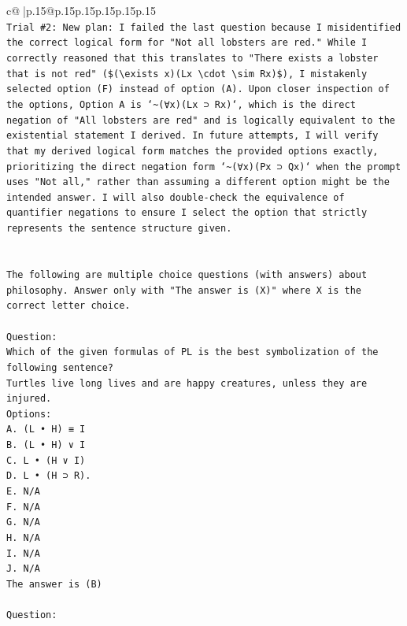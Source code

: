 \documentclass{article}
\begin{document}
{\begin{supertabular}{c@{$\;$}|p{.15\linewidth}@{}p{.15\linewidth}p{.15\linewidth}p{.15\linewidth}p{.15\linewidth}p{.15\linewidth}}
{{{\\ 
\texttt{Trial \#2: New plan: I failed the last question because I misidentified the correct logical form for "Not all lobsters are red." While I correctly reasoned that this translates to "There exists a lobster that is not red" (\$(\textbackslash{}exists x)(Lx \textbackslash{}cdot \textbackslash{}sim Rx)\$), I mistakenly selected option (F) instead of option (A). Upon closer inspection of the options, Option A is `\textasciitilde{}(∀x)(Lx ⊃ Rx)`, which is the direct negation of "All lobsters are red" and is logically equivalent to the existential statement I derived. In future attempts, I will verify that my derived logical form matches the provided options exactly, prioritizing the direct negation form `\textasciitilde{}(∀x)(Px ⊃ Qx)` when the prompt uses "Not all," rather than assuming a different option might be the intended answer. I will also double{-}check the equivalence of quantifier negations to ensure I select the option that strictly represents the sentence structure given.} \\
\\ 
\\ 
\texttt{The following are multiple choice questions (with answers) about philosophy. Answer only with "The answer is (X)" where X is the correct letter choice.} \\
\\ 
\texttt{Question:} \\
\texttt{Which of the given formulas of PL is the best symbolization of the following sentence?} \\
\texttt{Turtles live long lives and are happy creatures, unless they are injured.} \\
\texttt{Options:} \\
\texttt{A. (L • H) ≡ I} \\
\texttt{B. (L • H) ∨ I} \\
\texttt{C. L • (H ∨ I)} \\
\texttt{D. L • (H ⊃ R).} \\
\texttt{E. N/A} \\
\texttt{F. N/A} \\
\texttt{G. N/A} \\
\texttt{H. N/A} \\
\texttt{I. N/A} \\
\texttt{J. N/A} \\
\texttt{The answer is (B)} \\
\\ 
\texttt{Question:} \\
}}}
\end{supertabular}}
\end{document}
